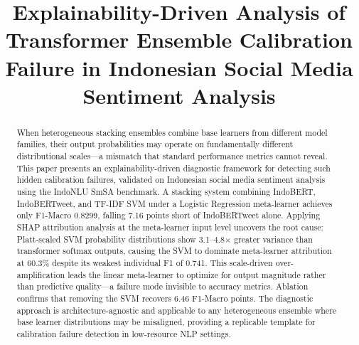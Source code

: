 \documentclass[conference]{IEEEtran}
\begin{document}
\title{Explainability-Driven Analysis of Transformer Ensemble Calibration Failure in Indonesian Social Media Sentiment Analysis}

\author{
\and
{}
}

\maketitle

\begin{abstract}
When heterogeneous stacking ensembles combine base learners from different model families, their output probabilities may operate on fundamentally different distributional scales---a mismatch that standard performance metrics cannot reveal. This paper presents an explainability-driven diagnostic framework for detecting such hidden calibration failures, validated on Indonesian social media sentiment analysis using the IndoNLU SmSA benchmark. A stacking system combining IndoBERT, IndoBERTweet, and TF-IDF SVM under a Logistic Regression meta-learner achieves only F1-Macro 0.8299, falling 7.16 points short of IndoBERTweet alone. Applying SHAP attribution analysis at the meta-learner input level uncovers the root cause: Platt-scaled SVM probability distributions show 3.1--4.8$\times$ greater variance than transformer softmax outputs, causing the SVM to dominate meta-learner attribution at 60.3\% despite its weakest individual F1 of 0.741. This scale-driven over-amplification leads the linear meta-learner to optimize for output magnitude rather than predictive quality---a failure mode invisible to accuracy metrics. Ablation confirms that removing the SVM recovers 6.46 F1-Macro points. The diagnostic approach is architecture-agnostic and applicable to any heterogeneous ensemble where base learner distributions may be misaligned, providing a replicable template for calibration failure detection in low-resource NLP settings.
\end{abstract}
\end{document}
